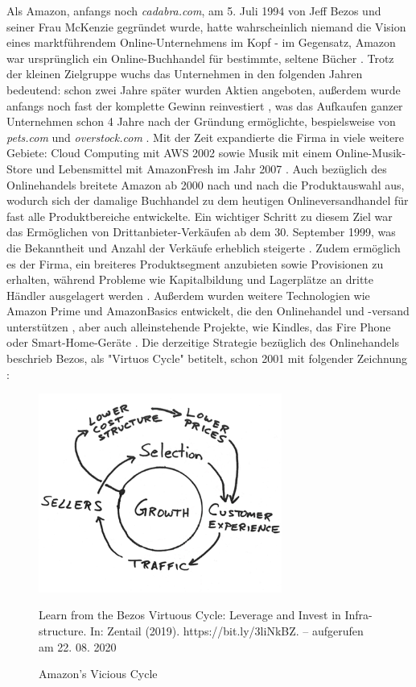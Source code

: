 Als Amazon, anfangs noch \emph{cadabra.com}, am 5. Juli 1994 von Jeff Bezos und seiner Frau McKenzie gegründet wurde, hatte wahrscheinlich niemand die Vision eines marktführendem Online-Unternehmens im Kopf - im Gegensatz, Amazon war ursprünglich ein Online-Buchhandel für bestimmte, seltene Bücher \cite[S. 17]{Graf}. Trotz der kleinen Zielgruppe wuchs das Unternehmen in den folgenden Jahren bedeutend: schon zwei Jahre später wurden Aktien angeboten, außerdem wurde anfangs noch fast der komplette Gewinn reinvestiert \cite{Rosoff}, was das Aufkaufen ganzer Unternehmen schon 4 Jahre nach der Gründung ermöglichte, bespielsweise von \emph{pets.com} und \emph{overstock.com} \cite{ChannelAdvisor}. Mit der Zeit expandierte die Firma in viele weitere Gebiete: Cloud Computing mit \ac{AWS} 2002 sowie Musik mit einem Online-Musik-Store und Lebensmittel mit AmazonFresh im Jahr 2007 \cite{Sherman, ChannelAdvisor}. Auch bezüglich des Onlinehandels breitete Amazon ab 2000 nach und nach die Produktauswahl aus, wodurch sich der damalige Buchhandel zu dem heutigen Onlineversandhandel für fast alle Produktbereiche entwickelte. Ein wichtiger Schritt zu diesem Ziel war das Ermöglichen von Drittanbieter-Verkäufen ab dem 30. September 1999, was die Bekanntheit und Anzahl der Verkäufe erheblich steigerte \cite{Sherman}. Zudem ermöglich es der Firma, ein breiteres Produktsegment anzubieten sowie Provisionen zu erhalten, während Probleme wie Kapitalbildung und Lagerplätze an dritte Händler ausgelagert werden \cite[S. 50]{evilcom}. Außerdem wurden weitere Technologien wie Amazon Prime und AmazonBasics entwickelt, die den Onlinehandel und -versand unterstützen \cite{ChannelAdvisor}, aber auch alleinstehende Projekte, wie Kindles, das Fire Phone oder Smart-Home-Geräte \cite{Sherman}.
Die derzeitige Strategie bezüglich des Onlinehandels beschrieb Bezos, als "Virtuos Cycle" betitelt, schon 2001  mit folgender Zeichnung \cite{zentail}:

\begin{figure}[h]
    \begin{center}
        \includegraphics[width=8cm]{media/Fabian-vicious-cycle.png}
        \caption{Amazon's Vicious Cycle}
        \label{vicious-cycle}
        \bildquelle Learn from the Bezos Virtuous Cycle: Leverage and Invest in Infra-
structure. In: Zentail (2019). https://bit.ly/3liNkBZ. – aufgerufen am 22. 08. 2020

    \end{center}
\end{figure} 

